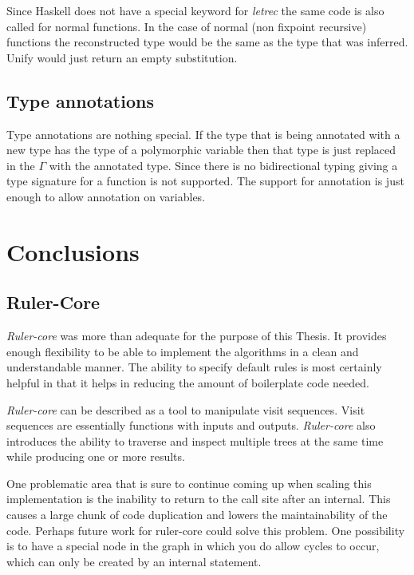\documentclass[twoside, titlepage, openright, a4paper]{book}
\newcommand{\Rcore}{\emph{Ruler-core }}
\begin{document}
Since Haskell does not have a special keyword for \emph{letrec} the same code is also called for normal functions. In the case of normal (non fixpoint recursive) functions the reconstructed type would be the same as the type that was inferred. Unify would just return an empty substitution.

\section{Type annotations}
Type annotations are nothing special. If the type that is being annotated with a new type has the type of a polymorphic variable then that type is just replaced in the $\Gamma$ with the annotated type. Since there is no bidirectional typing giving a type signature for a function is not supported. The support for annotation is just enough to allow annotation on variables.

\chapter{Conclusions}
\section{Ruler-Core}
\Rcore was more than adequate for the purpose of this Thesis. It provides enough flexibility to be able to implement the algorithms in a clean and understandable manner. The ability to specify default rules is most certainly helpful in that it helps in reducing the amount of boilerplate code needed.

\Rcore can be described as a tool to manipulate visit sequences. Visit sequences are essentially functions with inputs and outputs. \Rcore also introduces the ability to traverse and inspect multiple trees at the same time while producing one or more results. 

One problematic area that is sure to continue coming up when scaling this implementation is the inability to return to the call site after an internal.
This causes a large chunk of code duplication and lowers the maintainability of the code. Perhaps future work for ruler-core could solve this problem. One possibility is to have a special node in the graph in which you do allow cycles to occur, which can only be created by an internal statement.
\end{document}
